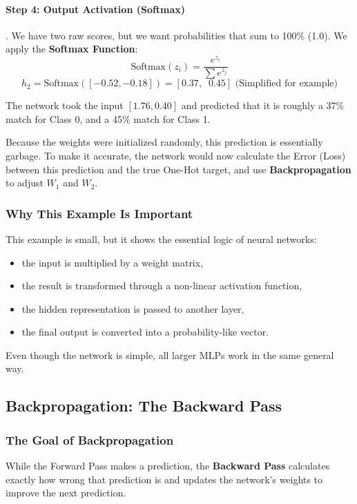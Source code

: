 \documentclass[11pt]{article}
\theoremstyle{smallexample}
\begin{document}
\paragraph*{Step 4: Output Activation (Softmax)}.
We have two raw scores, but we want probabilities that sum to 100\% (1.0). We apply the \textbf{Softmax Function}:
\[ \text{Softmax}(z_i) = \frac{e^{z_i}}{\sum e^{z_j}} \]
\[ h_2 = \text{Softmax}([-0.52, -0.18]) = [0.37, \;\; 0.45] \text{ (Simplified for example)} \]


The network took the input $[1.76, 0.40]$ and predicted that it is roughly a 37\% match for Class 0, and a 45\% match for Class 1. 

Because the weights were initialized randomly, this prediction is essentially garbage. To make it accurate, the network would now calculate the Error (Loss) between this prediction and the true One-Hot target, and use \textbf{Backpropagation} to adjust $W_1$ and $W_2$.

\subsubsection{Why This Example Is Important}

This example is small, but it shows the essential logic of neural networks:
\begin{itemize}
    \item the input is multiplied by a weight matrix,
    \item the result is transformed through a non-linear activation function,
    \item the hidden representation is passed to another layer,
    \item the final output is converted into a probability-like vector.
\end{itemize}

Even though the network is simple, all larger MLPs work in the same general way.


\subsection{Backpropagation: The Backward Pass}

\subsubsection{The Goal of Backpropagation}
While the Forward Pass makes a prediction, the \textbf{Backward Pass} calculates exactly how wrong that prediction is and updates the network's weights to improve the next prediction. 
\end{document}
